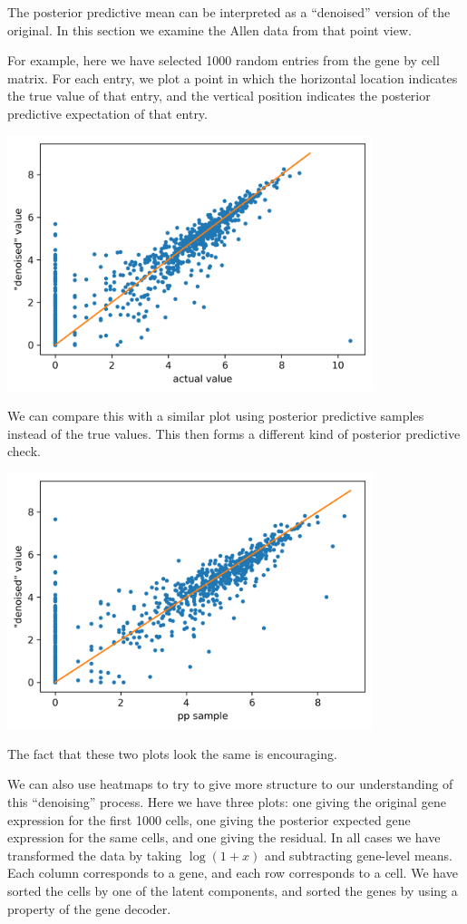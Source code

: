 The posterior predictive mean can be interpreted as a ``denoised'' version of the original.  In this section we examine the Allen data from that point view.

For example, here we have selected 1000 random entries from the gene by cell matrix.  For each entry, we plot a point in which the horizontal location indicates the true value of that entry, and the vertical position indicates the posterior predictive expectation of that entry.  

\includegraphics[width=0.8\textwidth]{pics/resids2}

We can compare this with a similar plot using posterior predictive samples instead of the true values.  This then forms a different kind of posterior predictive check.  

\includegraphics[width=0.8\textwidth]{pics/resids3}

The fact that these two plots look the same is encouraging.  

We can also use heatmaps to try to give more structure to our understanding of this ``denoising'' process.  Here we have three plots: one giving the original gene expression for the first 1000 cells, one giving the posterior expected gene expression for the same cells, and one giving the residual.  In all cases we have transformed the data by taking $\log(1+x)$ and subtracting gene-level means.  Each column corresponds to a gene, and each row corresponds to a cell.  We have sorted the cells by one of the latent components, and sorted the genes by using a property of the gene decoder.  

